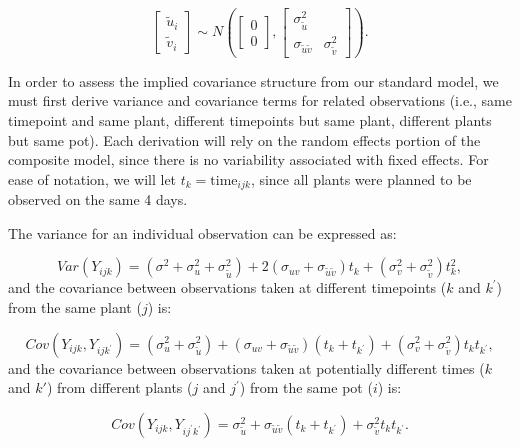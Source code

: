 \documentclass[
]{krantz}
\begin{document}
\[ \left[ \begin{array}{c}
            \tilde{u}_{i} \\ \tilde{v}_{i}
          \end{array}  \right] \sim N \left( \left[
          \begin{array}{c}
            0 \\ 0
          \end{array} \right], \left[
          \begin{array}{cc}
            \sigma_{\tilde{u}}^{2} & \\
            \sigma_{\tilde{u}\tilde{v}} & \sigma_{\tilde{v}}^{2}
          \end{array} \right] \right). \]

In order to assess the implied covariance structure from our standard model, we must first derive variance and covariance terms for related observations (i.e., same timepoint and same plant, different timepoints but same plant, different plants but same pot). Each derivation will rely on the random effects portion of the composite model, since there is no variability associated with fixed effects. For ease of notation, we will let \(t_{k}=\textrm{time}_{ijk}\), since all plants were planned to be observed on the same 4 days.

The variance for an individual observation can be expressed as:

\begin{equation}
Var(Y_{ijk}) = (\sigma^{2} + \sigma_{u}^{2} + \sigma_{\tilde{u}}^{2}) + 2(\sigma_{uv} + \sigma_{\tilde{u}\tilde{v}})t_k + (\sigma_{v}^{2} + \sigma_{\tilde{v}}^{2})t_{k}^{2},
\label{eq:var}
\end{equation}
and the covariance between observations taken at different timepoints (\(k\) and \(k^{'}\)) from the same plant (\(j\)) is:

\begin{equation}
Cov(Y_{ijk},Y_{ijk^{'}}) = (\sigma_{u}^{2} + \sigma_{\tilde{u}}^{2}) + (\sigma_{uv} + \sigma_{\tilde{u}\tilde{v}})(t_{k}+t_{k^{'}}) + 
(\sigma_{v}^{2} + \sigma_{\tilde{v}}^{2})t_{k}t_{k^{'}},
\label{eq:cov1}
\end{equation}
and the covariance between observations taken at potentially different times (\(k\) and \(k'\)) from different plants (\(j\) and \(j^{'}\)) from the same pot (\(i\)) is:

\begin{equation}
Cov(Y_{ijk},Y_{ij^{'}k^{'}}) = \sigma_{\tilde{u}}^{2} + \sigma_{\tilde{u}\tilde{v}}(t_{k}+t_{k^{'}}) + \sigma_{\tilde{v}}^{2}t_{k}t_{k^{'}}.
\label{eq:cov2}
\end{equation}
\end{document}
